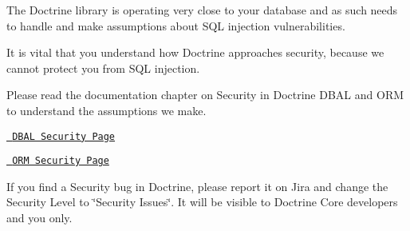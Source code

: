 The Doctrine library is operating very close to your database and as such needs to handle and make assumptions about SQL injection vulnerabilities.

It is vital that you understand how Doctrine approaches security, because we cannot protect you from SQL injection.

Please read the documentation chapter on Security in Doctrine DBAL and ORM to understand the assumptions we make.


\begin{DoxyItemize}
\item \href{https://www.doctrine-project.org/projects/doctrine-dbal/en/latest/reference/security.html}{\texttt{ DBAL Security Page}}
\item \href{https://www.doctrine-project.org/projects/doctrine-orm/en/latest/reference/security.html}{\texttt{ ORM Security Page}}
\end{DoxyItemize}

If you find a Security bug in Doctrine, please report it on Jira and change the Security Level to \char`\"{}\+Security Issues\char`\"{}. It will be visible to Doctrine Core developers and you only. 